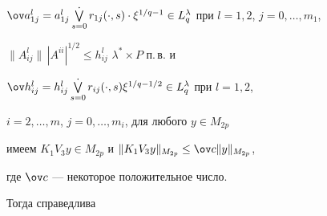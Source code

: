 $\ov a^l_{1j}=a^l_{1j}\bigvee\limits_{s=0}^{\displaystyle .}


r_{1j}(\cdot,s)\cdot


\xi^{1/q-1} \in L_q^\lambda$ при $l =1, 2$, $j = 0,\dotsc, m_1$, 


$\|A^l_{ij}\|\,|A^{ii}|^{1/2} \le h^l_{ij}$\; $\lambda^*\times P$ п.\,в. и 


$\ov h^l_{ij} = h^l_{ij}\bigvee \limits_{s=0}^{\displaystyle .}r_{ij}(\cdot,s)


\xi^{1/q-1/2} \in L_q^\lambda$ при $l = 1, 2$, 


$i = 2,\dotsc, m$, $j = 0,\dotsc, m_i$, для любого $y \in M_{2p}$ 


имеем $K_1V_3y \in M_{2p}$ и $\|K_1V_3y\|_{M_{2p}} \le \ov c\|y\|_{M_{2p}}$, 


где $\ov c$ --- некоторое положительное число. 


Тогда справедлива





